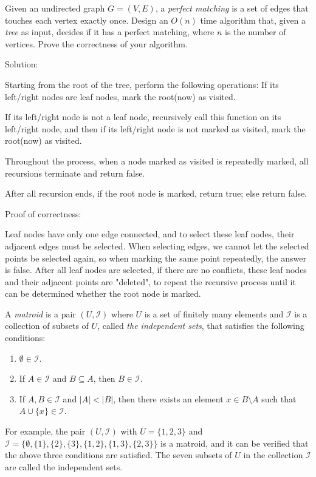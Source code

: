 \documentclass{oxmathproblems}
\begin{document}
\begin{questions}
\miquestion[25]
Given an undirected graph $G=(V,E)$, a \emph{perfect matching} is a set of edges that touches each vertex exactly once.
Design an $O(n)$ time algorithm that, given a \emph{tree} as input, decides if it has a perfect matching, where $n$ is the number of vertices.
Prove the correctness of your algorithm.

Solution:

Starting from the root of the tree, perform the following operations:
If its left/right nodes are leaf nodes, mark the root(now) as visited.

If its left/right node is not a leaf node, recursively call this function on its left/right node, and then if its left/right node is not marked as visited, mark the root(now) as visited.

Throughout the process, when a node marked as visited is repeatedly marked, all recursions terminate and return false.

After all recursion ends, if the root node is marked, return true; else return false.

Proof of correctness:

Leaf nodes have only one edge connected, and to select these leaf nodes, their adjacent edges must be selected. When selecting edges, we cannot let the selected points be selected again, so when marking the same point repeatedly, the answer is false. After all leaf nodes are selected, if there are no conflicts, these leaf nodes and their adjacent points are "deleted", to repeat the recursive process until it can be determined whether the root node is marked.

\miquestion[25]
A \emph{matroid} is a pair $(U,\mathcal{I})$ where $U$ is a set of finitely many elements and $\mathcal{I}$ is a collection of subsets of $U$, called \emph{the independent sets}, that satisfies the following conditions:
\begin{enumerate}
    \item $\emptyset\in\mathcal{I}$.
    \item If $A\in\mathcal{I}$ and $B\subseteq A$, then $B\in\mathcal{I}$.
    \item If $A,B\in\mathcal{I}$ and $|A|<|B|$, then there exists an element $x\in B\setminus A$ such that $A\cup\{x\}\in\mathcal{I}$.
\end{enumerate}
For example, the pair $(U,\mathcal{I})$ with $U=\{1,2,3\}$ and $\mathcal{I}=\{\emptyset,\{1\},\{2\},\{3\},\{1,2\},\{1,3\},\{2,3\}\}$ is a matroid, and it can be verified that the above three conditions are satisfied.
The seven subsets of $U$ in the collection $\mathcal{I}$ are called the independent sets.


\end{questions}
\end{document}
